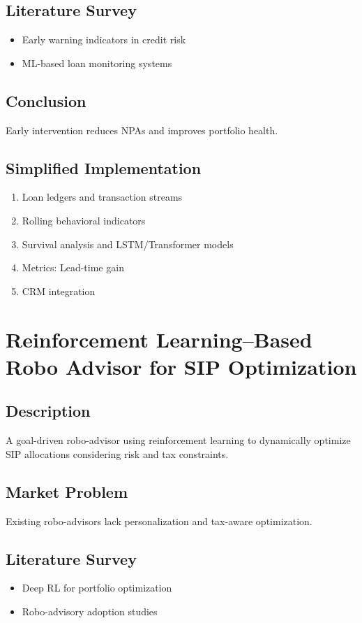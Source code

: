 \documentclass[11pt,a4paper]{article}
\begin{document}
\subsection*{Literature Survey}
\begin{itemize}[noitemsep]
    \item Early warning indicators in credit risk
    \item ML-based loan monitoring systems
\end{itemize}

\subsection*{Conclusion}
Early intervention reduces NPAs and improves portfolio health.

\subsection*{Simplified Implementation}
\begin{enumerate}[noitemsep]
    \item Loan ledgers and transaction streams
    \item Rolling behavioral indicators
    \item Survival analysis and LSTM/Transformer models
    \item Metrics: Lead-time gain
    \item CRM integration
\end{enumerate}

\section{Reinforcement Learning–Based Robo Advisor for SIP Optimization}

\subsection*{Description}
A goal-driven robo-advisor using reinforcement learning to dynamically optimize SIP allocations considering risk and tax constraints.

\subsection*{Market Problem}
Existing robo-advisors lack personalization and tax-aware optimization.

\subsection*{Literature Survey}
\begin{itemize}[noitemsep]
    \item Deep RL for portfolio optimization
    \item Robo-advisory adoption studies
\end{itemize}
\end{document}
